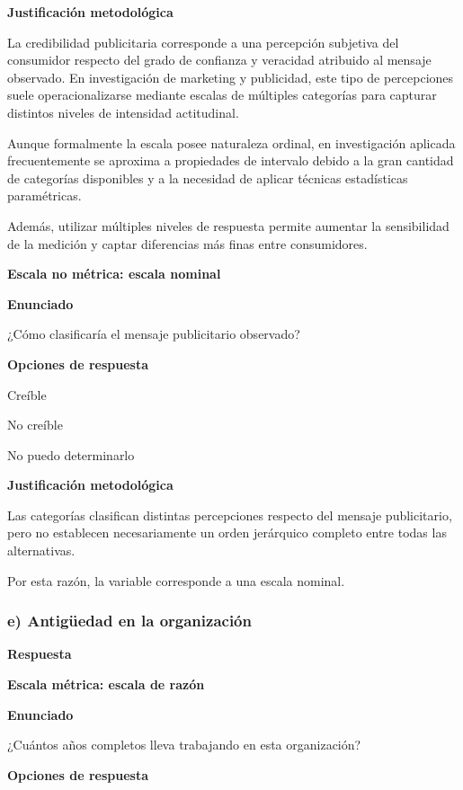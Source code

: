 \documentclass[12pt,letterpaper]{article}
\begin{document}
\textbf{Justificación metodológica}

La credibilidad publicitaria corresponde a una percepción subjetiva del consumidor respecto del grado de confianza y veracidad atribuido al mensaje observado. En investigación de marketing y publicidad, este tipo de percepciones suele operacionalizarse mediante escalas de múltiples categorías para capturar distintos niveles de intensidad actitudinal.

Aunque formalmente la escala posee naturaleza ordinal, en investigación aplicada frecuentemente se aproxima a propiedades de intervalo debido a la gran cantidad de categorías disponibles y a la necesidad de aplicar técnicas estadísticas paramétricas.

Además, utilizar múltiples niveles de respuesta permite aumentar la sensibilidad de la medición y captar diferencias más finas entre consumidores.

\textbf{Escala no métrica: escala nominal}

\textbf{Enunciado}

¿Cómo clasificaría el mensaje publicitario observado?

\textbf{Opciones de respuesta}

\begin{opciones}
\item Creíble
\item No creíble
\item No puedo determinarlo
\end{opciones}

\textbf{Justificación metodológica}

Las categorías clasifican distintas percepciones respecto del mensaje publicitario, pero no establecen necesariamente un orden jerárquico completo entre todas las alternativas.

Por esta razón, la variable corresponde a una escala nominal.

\subsubsection*{e) Antigüedad en la organización}

\textbf{Respuesta}

\textbf{Escala métrica: escala de razón}

\textbf{Enunciado}

¿Cuántos años completos lleva trabajando en esta organización?

\textbf{Opciones de respuesta}
\end{document}
